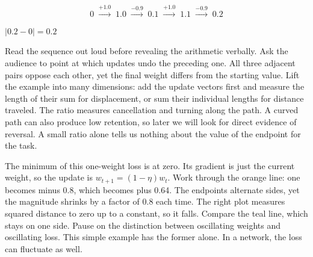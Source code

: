 {\vspace{2mm}
\[
        0 \;\xrightarrow{+1.0}\; 1.0 \;\xrightarrow{-0.9}\; 0.1
          \;\xrightarrow{+1.0}\; 1.1 \;\xrightarrow{-0.9}\; 0.2
\]
{\par \(\lvert 0.2-0\rvert=0.2\)}
\vspace{4mm}}
{Read the sequence out loud before revealing the arithmetic verbally. Ask the audience to point at which updates undo the preceding one. All three adjacent pairs oppose each other, yet the final weight differs from the starting value. Lift the example into many dimensions: add the update vectors first and measure the length of their sum for displacement, or sum their individual lengths for distance traveled. The ratio measures cancellation and turning along the path. A curved path can also produce low retention, so later we will look for direct evidence of reversal. A small ratio alone tells us nothing about the value of the endpoint for the task.}

{
}
{The minimum of this one-weight loss is at zero. Its gradient is just the current weight, so the update is \(w_{t+1}=(1-\eta)w_t\). Work through the orange line: one becomes minus 0.8, which becomes plus 0.64. The endpoints alternate sides, yet the magnitude shrinks by a factor of 0.8 each time. The right plot measures squared distance to zero up to a constant, so it falls. Compare the teal line, which stays on one side. Pause on the distinction between oscillating weights and oscillating loss. This simple example has the former alone. In a network, the loss can fluctuate as well.}

